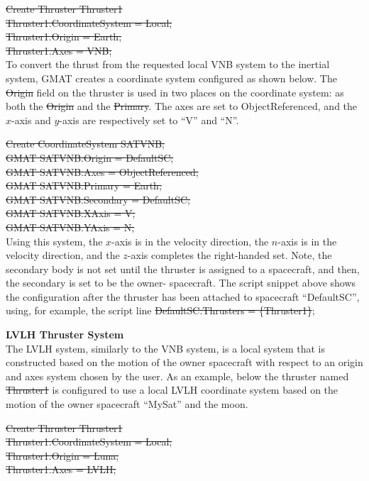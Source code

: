 \noindent\st{Create Thruster Thruster1}\\
\st{Thruster1.CoordinateSystem = Local;}\\
\st{Thruster1.Origin = Earth;}\\
\st{Thruster1.Axes   = VNB;}\\

To convert the thrust from the requested local VNB system to the
inertial system, GMAT creates a coordinate system configured as
shown below. The \st{Origin} field on the thruster is used in two
places on the coordinate system: as both the \st{Origin} and the
\st{Primary}. The axes are set to ObjectReferenced, and the $x$-axis
and $y$-axis are respectively set to ``V'' and ``N''.

\noindent\st{ Create CoordinateSystem SATVNB;}\\
\st{ GMAT SATVNB.Origin = DefaultSC; }\\
\st{ GMAT SATVNB.Axes = ObjectReferenced;}\\
\st{ GMAT SATVNB.Primary = Earth;}\\
\st{ GMAT SATVNB.Secondary = DefaultSC;}\\
\st{ GMAT SATVNB.XAxis = V; }\\
\st{ GMAT SATVNB.YAxis = N; }\\

Using this system, the $x$-axis is in the velocity direction, the
$n$-axis is in the velocity direction, and the $z$-axis completes
the right-handed set. Note, the secondary body is not set until the
thruster is assigned to a spacecraft, and then, the secondary is set
to be the owner- spacecraft.  The script snippet above shows the
configuration after the thruster has been attached to spacecraft
``DefaultSC'', using, for example, the script line
%
\st{DefaultSC.Thrusters = \{Thruster1\}};

\noindent \textbf{LVLH Thruster System}\\

The LVLH system, similarly to the VNB system, is a local system that
is constructed based on the motion of the owner spacecraft with
respect to an origin and axes system chosen by the user.  As an
example, below the thruster named \st{Thruster1} is configured to
use a local LVLH coordinate system based on the motion of the owner
spacecraft ``MySat'' and the moon.

\noindent\st{Create Thruster Thruster1}\\
\st{Thruster1.CoordinateSystem = Local;}\\
\st{Thruster1.Origin = Luna;}\\
\st{Thruster1.Axes   = LVLH;}\\

